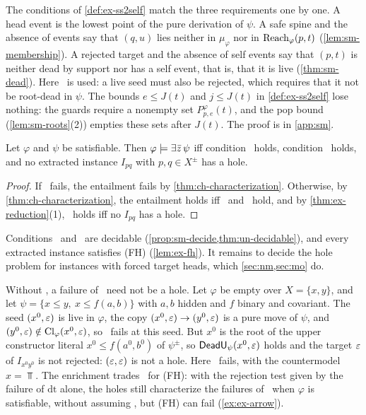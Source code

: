 The conditions of \cref{def:ex-ss2self} match the three requirements one by
one. A head event is the lowest point of the pure derivation of $\psi$. A safe
spine and the absence of events say that $(q,u)$ lies neither in $\mu_\varphi$
nor in $\operatorname{Reach}_\varphi(p,t)$ (\cref{lem:sm-membership}). A rejected target and the
absence of self events say that $(p,t)$ is neither dead by support nor has a
self event, that is, that it is live (\cref{thm:sm-dead}). Here \CondU\ is used:
a live seed must also be rejected, which requires that it not be root-dead in
$\psi$. The bounds $e\le J(t)$ and $j\le J(t)$ in \cref{def:ex-ss2self} lose
nothing: the guards require a nonempty set $P^\varphi_{p,e}(t)$, and the pop bound
(\cref{lem:sm-roots}(2)) empties these sets after $J(t)$. The proof is in
\cref{app:sm}.

\begin{corollary}\label{cor:ex-entailment}
Let $\varphi$ and $\psi$ be satisfiable. Then $\varphi\models\exists\bar z\,\psi$ iff
condition \CondI\ holds, condition \CondU\ holds, and no extracted instance
$I_{pq}$ with $p,q\in X^\pm$ has a hole.
\end{corollary}

\begin{proof}
If \CondU\ fails, the entailment fails by \cref{thm:ch-characterization}.
Otherwise, by \cref{thm:ch-characterization}, the entailment holds iff \CondI\
and \CondII\ hold, and by \cref{thm:ex-reduction}(1), \CondII\ holds iff no
$I_{pq}$ has a hole.
\end{proof}

Conditions \CondI\ and \CondU\ are decidable
(\cref{prop:sm-decide,thm:un-decidable}), and every extracted instance
satisfies (FH) (\cref{lem:ex-fh}). It remains to decide the hole problem for
instances with forced target heads, which \cref{sec:nm,sec:mo} do.

\begin{example}[Condition (U) cannot be dropped]\label{ex:ex-u-needed}
Without \CondU, a failure of \CondII\ need not be a hole. Let $\varphi$ be
empty over $X=\{x,y\}$, and let $\psi=\{x\le y,\ x\le f(a,b)\}$ with $a,b$
hidden and $f$ binary and covariant. The seed $(x^0,\varepsilon)$ is live in
$\varphi$, the copy $(x^0,\varepsilon)\to(y^0,\varepsilon)$ is a pure move of $\psi$, and
$(y^0,\varepsilon)\notin\operatorname{Cl}_\varphi(x^0,\varepsilon)$, so \CondII\ fails at this seed. But
$x^0$ is the root of the upper constructor literal $x^0\le f(a^0,b^0)$ of
$\psi^\pm$, so $\mathsf{DeadU}_\psi(x^0,\varepsilon)$ holds and the target $\varepsilon$ of
$I_{x^0y^0}$ is not rejected: $(\varepsilon,\varepsilon)$ is not a hole. Here \CondU\ fails,
with the countermodel $x=\Top$. The enrichment trades \CondU\ for (FH): with
the rejection test given by the failure of $\mathrm{dt}$ alone, the holes still
characterize the failures of \CondII\ when $\varphi$ is satisfiable, without
assuming \CondU, but (FH) can fail (\cref{ex:ex-arrow}).
\end{example}

